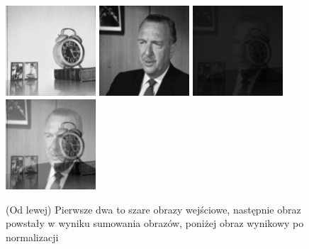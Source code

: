 \documentclass[final,a4paper,openany,12pt]{mwbk}
\begin{document}
\begin{figure}[H]
	\begin{center}
		\includegraphics[width=0.3\textwidth]{1/1Gray_Img1_Sum_Original}
		\includegraphics[width=0.3\textwidth]{1/1Gray_Img2_Sum_Original}
		\includegraphics[width=0.3\textwidth]{1/1Gray_Img_Sum_Result}
		\includegraphics[width=0.3\textwidth]{1/1Gray_Img_Sum_Result_Norm}
	\end{center}
	\caption{(Od lewej) Pierwsze dwa to szare obrazy wejściowe, następnie obraz powstały w wyniku sumowania obrazów, poniżej obraz wynikowy po normalizacji }
\end{figure}
\end{document}
